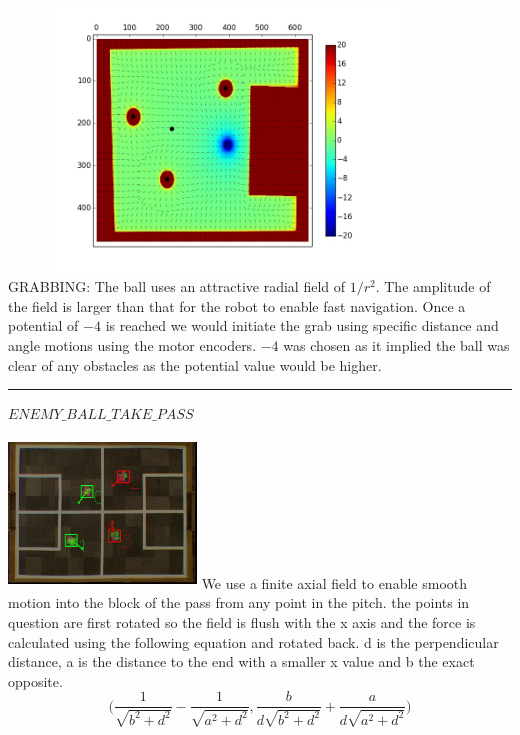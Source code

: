 \documentclass[a4paper,12pt]{article}
\begin{document}
\begin{minipage}{0.5\textwidth}
\includegraphics[height=70mm,width=115mm]{p3.jpg}
GRABBING: The ball uses an attractive radial field of $1/r^2$. The amplitude of the field is larger than that for the robot to enable fast navigation. Once a potential of $-4$ is reached we would initiate the grab using specific distance and angle motions using the motor encoders. $-4$ was chosen as it implied the ball was clear of any obstacles as the potential value would be higher.
\end{minipage}\newline\newline
\rule{\textwidth}{1pt}\newline
$ENEMY\_BALL\_TAKE\_PASS$ \newline \newline
\begin{minipage}{0.5\textwidth}
\includegraphics[height=40mm,width=50mm]{v1_2.jpg}\newline\newline
We use a finite axial field to enable smooth motion into the block of the pass from any point in the pitch. the points in question are first rotated so the field is flush with the x axis and the force is calculated using the following equation and rotated back. d is the perpendicular distance, a is the distance to the end with a smaller x value and b the exact opposite.
 $$\Big(\frac{1}{\sqrt{b^2 + d^2}}-\frac{1}{\sqrt{a^2 + d^2}},\frac{b}{d\sqrt{b^2 + d^2}}+\frac{a}{d\sqrt{a^2 + d^2}}\Big)$$
\end{minipage}
\end{document}

